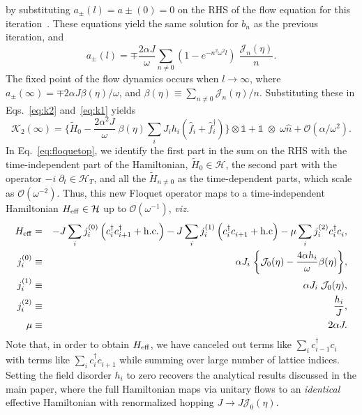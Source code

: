 \documentclass[aps,prl, notitlepage]{revtex4-1}
\begin{document}
by substituting $a_\pm(l)=a\pm(0)=0$ on the RHS of the flow equation for this iteration~\cite{Mintert}. These equations yield the same solution for $b_n$ as the previous iteration, and
\begin{equation}
a_\pm(l) = \mp\frac{2\alpha J}{\omega}  \sum_{n\neq0} \left(1-e^{-n^2\omega^2 l}\right)\; \frac{\mathcal{J}_n(\eta)}{n}.
\end{equation}
The fixed point of the flow dynamics occurs when $l\rightarrow\infty$, where $a_\pm(\infty)=\mp {2\alpha J\beta(\eta)}/{\omega}$, and $\beta(\eta)\equiv\sum_{n\neq 0} {\mathcal{J}_n(\eta)}/{n}$. Substituting these in Eqs.~\ref{eq:k2} and~\ref{eq:k1} yields
\begin{equation}
\label{eq:floquetop}
\mathcal{K}_2(\infty) =  \bigg\{\tilde{H}_0-\frac{2\alpha^2 J}{\omega}\;\beta(\eta)\sum_{i}  J_i h_i \left(\hat{f}^{\;}_i + \hat{f}^\dagger_i\right)\bigg\}\otimes \mathds{1} 
+\mathds{1}\;\otimes \; \omega \hat{n} + \mathcal{O}(\alpha/\omega^2).
\end{equation}
In Eq.~\ref{eq:floquetop}, we identify the first part in the sum on the RHS with the time-independent part of the Hamiltonian, $\tilde{H}_0 \in \mathcal{H}$, the second part with the operator $-i \; \partial_t  \in \mathcal{H}_T$, and all the $\tilde{H}_{n\neq 0}$  as the time-dependent parts, which scale as $\mathcal{O}(\omega^{-2})$. Thus, this new Floquet operator maps to a time-independent Hamiltonian $H_{\rm eff}\in\mathcal{H}$ up to $\mathcal{O}(\omega^{-1})$, \textit{viz.}
\begin{eqnarray}
\label{eq:heff}
H_{\rm eff}    &=&   -J\sum_i j^{(0)}_i\left(c^\dagger_i c^\dagger_{i+1} + \rm{h.c.}\right) 
		            -J\sum_i j^{(1)}_i\left(c^\dagger_i c^{\;}_{i+1}+\rm{h.c}\right) 
		            -\mu\sum_i j^{(2)}_i c^\dagger_i c^{\;}_i, \nonumber \\
j^{(0)}_i            &\equiv& \alpha J_i\; \bigg\{\mathcal{J}_0(\eta) - \frac{4\alpha h_i}{\omega}\beta(\eta)\bigg\} ,\nonumber \\
j^{(1)}_i            &\equiv& \alpha J_i \; \mathcal{J}_0(\eta) ,\nonumber \\
j^{(2)}_i            &\equiv& \frac{h_i}{J},\nonumber \\
\mu 		     &\equiv& 2\alpha J.
\end{eqnarray}
Note that, in order to obtain $H_{\rm eff}$, we have canceled out terms like $\sum_i c^\dagger_{i-1}c^{\;}_i$ with terms like $\sum_i c^\dagger_i c^{\;}_{i+1}$ while summing over large number of lattice indices. Setting the field disorder $h_i$ to zero recovers the analytical results discussed in the main paper, where the full Hamiltonian maps via unitary flows to an \textit{identical} effective Hamiltonian with renormalized hopping $J\rightarrow J \mathcal{J}_0(\eta)$.
\end{document}
